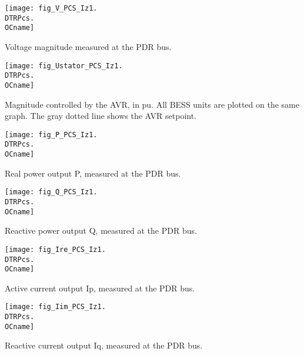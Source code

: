 {%
    \noindent
    \begin{minipage}[t]{0.48\textwidth}
        \centering
        \texttt{[image: fig\_V\_PCS\_Iz1.\\DTRPcs.\\OCname]}
        \begin{minipage}[t]{0.8\textwidth}
            \small Voltage magnitude measured at the PDR bus.
        \end{minipage}
    \end{minipage}
    \hfill
    \begin{minipage}[t]{0.48\textwidth}
        \centering
        \texttt{[image: fig\_Ustator\_PCS\_Iz1.\\DTRPcs.\\OCname]}
        \begin{minipage}[t]{0.8\textwidth}
            \small Magnitude controlled by the AVR, in pu. All BESS
            units are plotted on the same graph. The gray dotted
            line shows the AVR setpoint.
        \end{minipage}
    \end{minipage}
%
    \vspace{0.5cm}
    \begin{minipage}[t]{0.48\textwidth}
        \centering
        \texttt{[image: fig\_P\_PCS\_Iz1.\\DTRPcs.\\OCname]}
        \begin{minipage}[t]{0.8\textwidth}
            \small Real power output P, measured at the PDR bus.
        \end{minipage}
    \end{minipage}
    \hfill
    \begin{minipage}[t]{0.48\textwidth}
        \centering
        \texttt{[image: fig\_Q\_PCS\_Iz1.\\DTRPcs.\\OCname]}
        \begin{minipage}[t]{0.8\textwidth}
            \small Reactive power output Q, measured at the PDR bus.
        \end{minipage}
    \end{minipage}

    \vspace{0.5cm}
    \begin{minipage}[t]{0.48\textwidth}
        \centering
        \texttt{[image: fig\_Ire\_PCS\_Iz1.\\DTRPcs.\\OCname]}
        \begin{minipage}[t]{0.8\textwidth}
            \small Active current output Ip, measured at the PDR bus.
        \end{minipage}
    \end{minipage}
%
    \hfill
    \begin{minipage}[t]{0.48\textwidth}
        \centering
        \texttt{[image: fig\_Iim\_PCS\_Iz1.\\DTRPcs.\\OCname]}
        \begin{minipage}[t]{0.8\textwidth}
            \small Reactive current output Iq, measured at the PDR bus.
        \end{minipage}
    \end{minipage}
}
